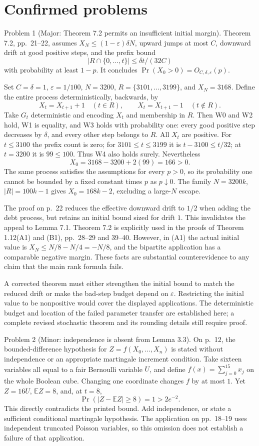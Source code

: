 \documentclass[10pt]{article}
\begin{document}
\section*{Confirmed problems}
Problem 1 (Major: Theorem 7.2 permits an insufficient initial margin).  Theorem 7.2, pp. 21–22, assumes \(X_N\le(1-\varepsilon)\delta N\), upward jumps at most \(C\), downward drift at good positive steps, and the prefix bound \[|R\cap\{0,\ldots,t\}|\le \delta t/(32C)\] with probability at least \(1-p\). It concludes \(\Pr(X_0>0)=O_{C,\delta,\varepsilon}(p)\).\par
Set \(C=\delta=1\), \(\varepsilon=1/100\), \(N=3200\), \(R=\{3101,\ldots,3199\}\), and \(X_N=3168\). Define the entire process deterministically, backwards, by \[X_t=X_{t+1}+1\quad(t\in R),\qquad
 X_t=X_{t+1}-1\quad(t\notin R).\] Take \(G_t\) deterministic and encoding \(X_t\) and membership in \(R\). Then W0 and W2 hold, W1 is equality, and W3 holds with probability one: every good positive step decreases by \(\delta\), and every other step belongs to \(R\). All \(X_t\) are positive. For \(t\le3100\) the prefix count is zero; for \(3101\le t\le3199\) it is \(t-3100\le t/32\); at \(t=3200\) it is \(99\le100\). Thus W4 also holds surely. Nevertheless \[X_0=3168-3200+2(99)=166>0.\] The same process satisfies the assumptions for every \(p>0\), so its probability one cannot be bounded by a fixed constant times \(p\) as \(p\downarrow0\). The family \(N=3200k\), \(|R|=100k-1\) gives \(X_0=168k-2\), excluding a large-\(N\) escape.\par
The proof on p. 22 reduces the effective downward drift to \(1/2\) when adding the debt process, but retains an initial bound sized for drift \(1\). This invalidates the appeal to Lemma 7.1. Theorem 7.2 is explicitly used in the proofs of Theorem 1.12(A1) and (B1), pp. 28–29 and 39–40. However, in (A1) the actual initial value is \(X_N\le N/8-N/4=-N/8\), and the bipartite application has a comparable negative margin. These facts are substantial counterevidence to any claim that the main rank formula fails.\par
A corrected theorem must either strengthen the initial bound to match the reduced drift or make the bad-step budget depend on \(\varepsilon\). Restricting the initial value to be nonpositive would cover the displayed applications. The deterministic budget and location of the failed parameter transfer are established here; a complete revised stochastic theorem and its rounding details still require proof.\par
Problem 2 (Minor: independence is absent from Lemma 3.3).  On p. 12, the bounded-difference hypothesis for \(Z=f(X_0,\ldots,X_n)\) is stated without independence or an appropriate martingale increment condition. Take sixteen variables all equal to a fair Bernoulli variable \(U\), and define \(f(x)=\sum_{j=0}^{15}x_j\) on the whole Boolean cube. Changing one coordinate changes \(f\) by at most \(1\). Yet \(Z=16U\), \(\mathbb{E}Z=8\), and, at \(t=8\), \[\Pr(|Z-\mathbb{E}Z|\ge8)=1>2e^{-2}.\] This directly contradicts the printed bound. Add independence, or state a sufficient conditional martingale hypothesis. The application on pp. 18–19 uses independent truncated Poisson variables, so this omission does not establish a failure of that application.\par
\end{document}
